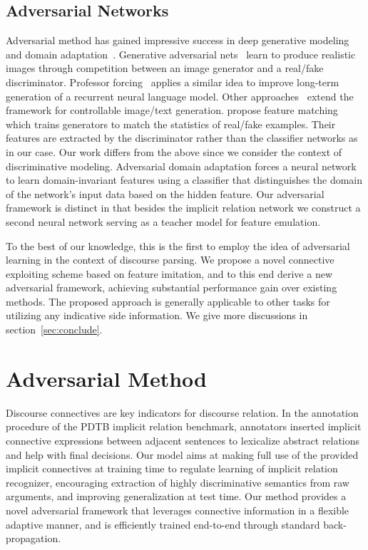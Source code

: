 \documentclass[11pt,a4paper]{article}
\begin{document}
\subsection{Adversarial Networks}
Adversarial method has gained impressive success in deep generative modeling~\cite{goodfellow2014generative} and domain adaptation~\cite{ganin2016domain}. Generative adversarial nets~\cite{goodfellow2014generative} learn to produce realistic images through competition between an image generator and a real/fake discriminator. Professor forcing~\cite{lamb2016professor} applies a similar idea to improve long-term generation of a recurrent neural language model. Other approaches~\cite{chen2016infogan,hu2017controllable} extend the framework for controllable image/text generation.  propose feature matching which trains generators to match the statistics of real/fake examples. Their features are extracted by the discriminator rather than the classifier networks as in our case. Our work differs from the above since we consider the context of discriminative modeling. Adversarial domain adaptation forces a neural network to learn domain-invariant features using a classifier that distinguishes the domain of the network's input data based on the hidden feature. Our adversarial framework is distinct in that besides the implicit relation network we construct a second neural network serving as a teacher model for feature emulation. 

To the best of our knowledge, this is the first to employ the idea of adversarial learning in the context of discourse parsing. We propose a novel connective exploiting scheme based on feature imitation, and to this end derive a new adversarial framework, achieving substantial performance gain over existing methods. The proposed approach is generally applicable to other tasks for utilizing any indicative side information. We give more discussions in section~\ref{sec:conclude}. 
 

\section{Adversarial Method}\label{sec:model}
Discourse connectives are key indicators for discourse relation. In the annotation procedure of the PDTB implicit relation benchmark, annotators inserted implicit connective expressions  between adjacent sentences to lexicalize abstract relations and help with final decisions. Our model aims at making full use of the provided implicit connectives at training time to regulate learning of implicit relation recognizer, encouraging extraction of highly discriminative semantics from raw arguments, and improving generalization at test time. Our method provides a novel adversarial framework that leverages connective information in a flexible adaptive manner, and is efficiently trained end-to-end through standard back-propagation.
\end{document}
